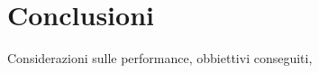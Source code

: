 \documentclass[12pt,a4paper,twoside,openright]{book}
\begin{document}
\chapter{Conclusioni}
Considerazioni sulle performance, obbiettivi conseguiti,

\backmatter
{}

%
\end{document}
